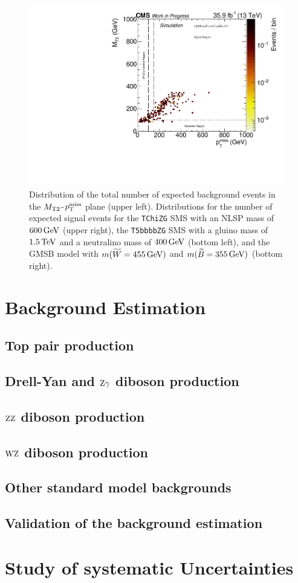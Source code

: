 \begin{figure}[htb]
 \includegraphics[width=\pairwidth]{figures/plots_2d/DataMC_sameHistograms_LL+signal_onZ__LL__MetMt2_SIG_gmsb_415_355_}
 \caption{Distribution of the total number of expected background events in the $M_{\mathrm{T2}}$-$p_{\mathrm{T}}^\text{miss}$ plane (upper left). Distributions for the number of expected signal events for the \texttt{TChiZG} SMS with an NLSP mass of $600\,\text{Ge\hspace{-.08em}V}$ (upper right), the \texttt{T5bbbbZG} SMS with a gluino mass of $1.5\,\text{Te\hspace{-.08em}V}$ and a neutralino mass of $400\,\text{Ge\hspace{-.08em}V}$ (bottom left), and the GMSB model with $m(\widetilde{W}=455\,\text{Ge\hspace{-.08em}V})$ and $m(\widetilde{B}=355\,\text{Ge\hspace{-.08em}V})$ (bottom right).}
 \label{fig:Regions2}
\end{figure}



\section{Background Estimation}\label{sec:BKG}
\subsection{Top pair production}\label{sec:ttbar}
\subsection{Drell-Yan and $\mathrm{Z}\gamma$ diboson production}
\subsection{$\mathrm{Z}\mathrm{Z}$ diboson production}
\subsection{$\mathrm{W}\mathrm{Z}$ diboson production}
\subsection{Other standard model backgrounds}
\subsection{Validation of the background estimation}
\section{Study of systematic Uncertainties}
